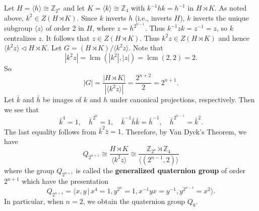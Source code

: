 \begin{example}
	Let $H = \langle h \rangle \cong \mathbb{Z}_{2^n}$ and let $K = \langle k \rangle \cong \mathbb{Z}_4$ with $k^{-1}hk = h^{-1}$ in $H\rtimes K$. As noted above, $k^2 \in Z(H\rtimes K)$. Since $k$ inverts $h$ (i.e., inverts $H$), $k$ inverts the unique subgroup $\langle z \rangle$ of order 2 in $H$, where $z = h^{2^{n-1}}$. Thus $k^{-1}zk = z^{-1} = z$, so $k$ centralizes $z$. It follows that $z \in Z(H\rtimes K)$. Thus $k^2z \in Z(H\rtimes K)$ and hence $\langle k^2z \rangle \lhd H\rtimes K$. Let $G = (H\rtimes K)/\langle k^2z \rangle$. Note that
	\begin{equation*}
		|k^2z| = \operatorname{lcm}(|k^2|,  |z|) = \operatorname{lcm}(2,2) =  2.
	\end{equation*} So 
	\begin{equation*}
		|G| = \frac{|H\rtimes K|}{|\langle k^2z\rangle|} = \frac{2^{n+2}}{2} = 2^{n+1}.
	\end{equation*}
	Let $\bar{k}$ and $\bar{h}$ be images of $k$ and $h$ under canonical projections, respectively. Then we see that 
	\begin{equation*}
		\bar{k}^4 = 1,\quad \bar{h}^{2^n} =1,\quad \bar{k}^{-1}\bar{h}\bar{k} = \bar{h}^{-1},\quad  \bar{h}^{2^{n-1}} = \bar{k}^2.
	\end{equation*}
	The last equality follows from $\bar{k}^2 \bar{z} = 1$. Therefore, by Van Dyck's Theorem, we have
	\begin{equation*}
		Q_{2^{n+1}}\cong  \frac{H\rtimes K}{\langle k^2z \rangle} \cong \frac{\mathbb{Z}_{2^n} \rtimes \mathbb{Z}_4}{\langle (2^{n-1},2) \rangle} 
	\end{equation*}
	where the group $Q_{2^{n+1}}$ is called the \textbf{generalized quaternion group} of order $2^{n+1}$ which have the presentation
	\begin{equation*}
		Q_{2^{n+1}} = \langle x,y \,|\, x^4 = 1, y^{2^{n}} = 1, x^{-1}yx = y^{-1}, y^{2^{n-1}}=x^2\rangle.
	\end{equation*}
	In particular, when $n=2$, we obtain the quaternion group $Q_{8}$.
\end{example}

